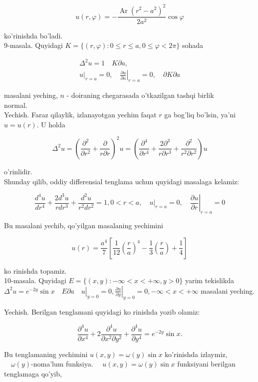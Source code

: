 \documentclass[10pt]{article}
\begin{document}
$$
u(r, \varphi)=-\frac{\operatorname{Ar}\left(r^{2}-a^{2}\right)^{2}}{2 a^{2}} \cos \varphi
$$

ko'rinishda bo'ladi.\\
9-masala. Quyidagi $K=\{(r, \varphi): 0 \leq r \leq a, 0 \leq \varphi<2 \pi\}$ sohada

$$
\begin{gathered}
\Delta^{2} u=1 \quad K \partial a, \\
\left.u\right|_{r=a}=0,\left.\quad \frac{\partial u}{\partial n}\right|_{r=a}=0, \quad \partial K \partial a
\end{gathered}
$$

masalani yeching, $n$ - doiraning chegarasada o'tkazilgan tashqi birlik\\
normal.\\
Yechish. Faraz qilaylik, izlanayotgan yechim faqat $r$ ga bog'liq bo'lsin, ya'ni $u=u(r)$. U holda

$$
\Delta^{2} u=\left(\frac{\partial^{2}}{\partial r^{2}}+\frac{\partial}{r \partial r}\right)^{2} u=\left(\frac{\partial^{4}}{\partial r^{4}}+\frac{2 \partial^{3}}{r \partial r^{3}}+\frac{\partial^{2}}{r^{2} \partial r^{2}}\right) u
$$

o'rinlidir.\\
Shunday qilib, oddiy differensial tenglama uchun quyidagi masalaga kelamiz:

$$
\frac{d^{4} u}{d r^{4}}+\frac{2 d^{3} u}{r d r^{3}}+\frac{d^{2} u}{r^{2} d r^{2}}=1,0<r<a,\left.\quad u\right|_{r=a}=0,\left.\quad \frac{\partial u}{\partial r}\right|_{r=a}=0
$$

Bu masalani yechib, qo'yilgan masalaning yechimini

$$
u(r)=\frac{a^{4}}{7}\left[\frac{1}{12}\left(\frac{r}{a}\right)^{4}-\frac{1}{3}\left(\frac{r}{a}\right)+\frac{1}{4}\right]
$$

ko rinishda topamiz.\\
10-masala. Quyidagi $E=\{(x, y):-\infty<x<+\infty, y>0\}$ yarim tekislikda $\Delta^{2} u=\left.e^{-2 y} \sin x \quad E \partial a \quad u\right|_{y=0}=0,\left.\frac{\partial u}{\partial y}\right|_{y=0}=0,-\infty<x<+\infty$ masalani yeching.

Yechish. Berilgan tenglamani quyidagi ko rinishda yozib olamiz:

$$
\frac{\partial^{4} u}{\partial x^{4}}+2 \frac{\partial^{4} u}{\partial x^{2} \partial y^{2}}+\frac{\partial^{4} u}{\partial y^{4}}=e^{-2 y} \sin x .
$$

Bu tenglamaning yechimini $u(x, y)=\omega(y) \sin x$ ko'rinishda izlaymiz, $\quad \omega(y)$-noma'lum funksiya. $\quad u(x, y)=\omega(y) \sin x$ funksiyani berilgan tenglamaga qo'yib,
\end{document}
